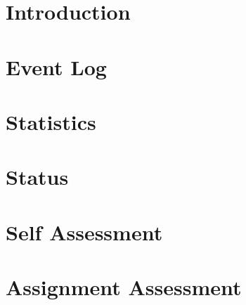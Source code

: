 \documentclass[12pt]{article}
\begin{document}

\tableofcontents
\section{Introduction}


\section{Event Log}



\section{Statistics}



\section{Status}



\section{Self Assessment}



\section{Assignment Assessment}



\end{document}
